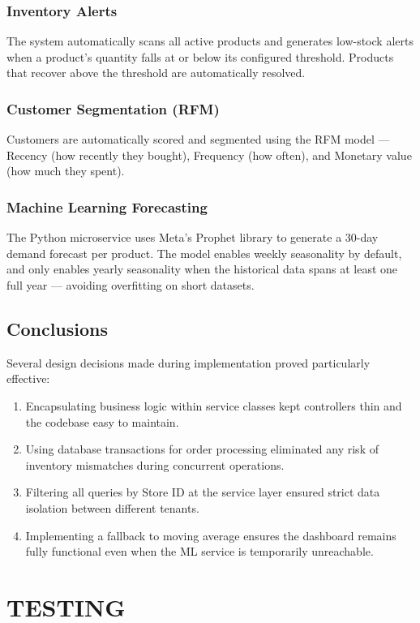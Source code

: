 \documentclass[12pt,a4paper]{report}
\begin{document}
\subsection{Inventory Alerts}
The system automatically scans all active products and generates low-stock alerts when a product's quantity falls at or below its configured threshold. Products that recover above the threshold are automatically resolved.

\subsection{Customer Segmentation (RFM)}
Customers are automatically scored and segmented using the RFM model — Recency (how recently they bought), Frequency (how often), and Monetary value (how much they spent). 

\subsection{Machine Learning Forecasting}
The Python microservice uses Meta's Prophet library to generate a 30-day demand forecast per product. The model enables weekly seasonality by default, and only enables yearly seasonality when the historical data spans at least one full year — avoiding overfitting on short datasets.

\section{Conclusions}
Several design decisions made during implementation proved particularly effective:
\begin{enumerate}
    \item Encapsulating business logic within service classes kept controllers thin and the codebase easy to maintain.
    \item Using database transactions for order processing eliminated any risk of inventory mismatches during concurrent operations.
    \item Filtering all queries by Store ID at the service layer ensured strict data isolation between different tenants.
    \item Implementing a fallback to moving average ensures the dashboard remains fully functional even when the ML service is temporarily unreachable.
\end{enumerate}


\chapter{TESTING}
\end{document}

